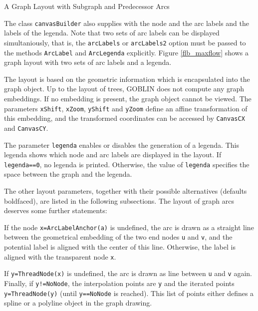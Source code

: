 \documentclass[a4paper,11pt,twoside]{book}
\begin{document}
\begin{multicols}{2}
\bigskip
\begin{figurehere}
\begin{center}
\epsfxsize=9cm
\vspace{0.5cm}
\caption{\label{flb_display1}A Graph Layout with Subgraph and Predecessor Arcs}
\end{center}
\end{figurehere}

The class \verb/canvasBuilder/ also supplies with the node and the arc labels
and the labels of the legenda. Note that two sets of arc labels can be
displayed simultaniously, that is, the \verb/arcLabels/ or \verb/arcLabels2/
option must be passed to the methods \verb/ArcLabel/ and \verb/ArcLegenda/
explicitly. Figure \ref{flb_maxflow} shows a graph layout with two sets of
arc labels and a legenda.

The layout is based on the geometric information which is encapsulated into the
graph object. Up to the layout of trees, GOBLIN does not compute any graph
embeddings. If no embedding is present, the graph object cannot be viewed.
The parameters \verb/xShift/, \verb/xZoom/, \verb/yShift/
and \verb/yZoom/ define an affine transformation of this embedding, and the
transformed coordinates can be accessed by \verb/CanvasCX/ and \verb/CanvasCY/.

The parameter \verb/legenda/ enables or disables the generation of a legenda.
This legenda shows which node and arc labels are displayed in the layout.
If \verb/legenda==0/, no legenda is printed. Otherwise, the value of
\verb/legenda/ specifies the space between the graph and the legenda.

The other layout parameters, together with their possible alternatives
(defaults boldfaced), are listed in the following subsections. The layout
of graph arcs deserves some further statements:

If the node \verb/x=ArcLabelAnchor(a)/ is undefined, the arc is drawn as a straight
line between the geometrical embedding of the two end nodes \verb/u/ and
\verb/v/, and the potential label is aligned with the center of this line.
Otherwise, the label is aligned with the transparent node \verb/x/.

If \verb/y=ThreadNode(x)/ is undefined, the arc is drawn as line between
\verb/u/ and \verb/v/ again. Finally, if \verb/y!=NoNode/, the interpolation
points are \verb/y/ and the iterated points \verb/y=ThreadNode(y)/ (until
\verb/y==NoNode/ is reached). This list of points either defines a spline or a
polyline object in the graph drawing.


\end{multicols}
\end{document}
